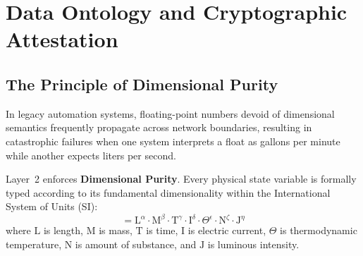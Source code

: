 \section{Data Ontology and Cryptographic Attestation}
\label{sec:l2_data_ontology}

\subsection{The Principle of Dimensional Purity}

In legacy automation systems, floating-point numbers devoid of dimensional semantics frequently propagate across network boundaries, resulting in catastrophic failures when one system interprets a float as gallons per minute while another expects liters per second.

Layer~2 enforces \textbf{Dimensional Purity}. Every physical state variable is formally typed according to its fundamental dimensionality within the International System of Units (SI):
\begin{equation}
[\mathrm{Dim}] = \mathrm{L}^\alpha \cdot \mathrm{M}^\beta \cdot \mathrm{T}^\gamma \cdot \mathrm{I}^\delta \cdot \Theta^\epsilon \cdot \mathrm{N}^\zeta \cdot \mathrm{J}^\eta
\label{eq:l2_si_dimensions}
\end{equation}
where $\mathrm{L}$ is length, $\mathrm{M}$ is mass, $\mathrm{T}$ is time, $\mathrm{I}$ is electric current, $\Theta$ is thermodynamic temperature, $\mathrm{N}$ is amount of substance, and $\mathrm{J}$ is luminous intensity.

